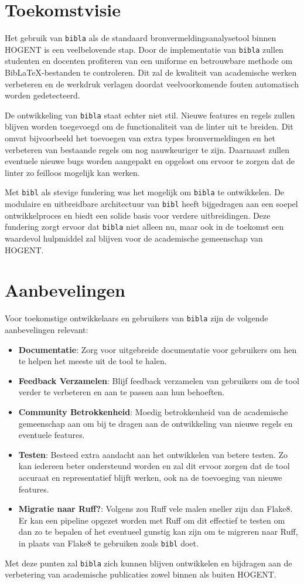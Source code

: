 \section{Toekomstvisie}
Het gebruik van \texttt{bibla} als de standaard bronvermeldingsanalysetool binnen HOGENT is een veelbelovende stap. Door de implementatie van \texttt{bibla} zullen studenten en docenten profiteren van een uniforme en betrouwbare methode om BibLaTeX-bestanden te controleren. Dit zal de kwaliteit van academische werken verbeteren en de werkdruk verlagen doordat veelvoorkomende fouten automatisch worden gedetecteerd.

De ontwikkeling van \texttt{bibla} staat echter niet stil. Nieuwe features en regels zullen blijven worden toegevoegd om de functionaliteit van de linter uit te breiden. Dit omvat bijvoorbeeld het toevoegen van extra types bronvermeldingen en het verbeteren van bestaande regels om nog nauwkeuriger te zijn. Daarnaast zullen eventuele nieuwe bugs worden aangepakt en opgelost om ervoor te zorgen dat de linter zo feilloos mogelijk kan werken.

Met \texttt{bibl} als stevige fundering was het mogelijk om \texttt{bibla} te ontwikkelen. De modulaire en uitbreidbare architectuur van \texttt{bibl} heeft bijgedragen aan een soepel ontwikkelproces en biedt een solide basis voor verdere uitbreidingen. Deze fundering zorgt ervoor dat \texttt{bibla} niet alleen nu, maar ook in de toekomst een waardevol hulpmiddel zal blijven voor de academische gemeenschap van HOGENT.

\section{Aanbevelingen}

Voor toekomstige ontwikkelaars en gebruikers van \texttt{bibla} zijn de volgende aanbevelingen relevant:
\begin{itemize}
  \item \textbf{Documentatie}: Zorg voor uitgebreide documentatie voor gebruikers om hen te helpen het meeste uit de tool te halen.
  \item \textbf{Feedback Verzamelen}: Blijf feedback verzamelen van gebruikers om de tool verder te verbeteren en aan te passen aan hun behoeften.
  \item \textbf{Community Betrokkenheid}: Moedig betrokkenheid van de academische gemeenschap aan om bij te dragen aan de ontwikkeling van nieuwe regels en eventuele features.
  \item \textbf{Testen}: Besteed extra aandacht aan het ontwikkelen van betere testen. Zo kan iedereen beter ondersteund worden en zal dit ervoor zorgen dat de tool accuraat en representatief blijft werken, ook na de toevoeging van nieuwe features.
  \item \textbf{Migratie naar Ruff?}: Volgens \textcite{Astral2024} zou Ruff vele malen sneller zijn dan Flake8. Er kan een pipeline opgezet worden met Ruff om dit effectief te testen om dan zo te bepalen of het eventueel gunstig kan zijn om te migreren naar Ruff, in plaats van Flake8 te gebruiken zoals \texttt{bibl} doet.
\end{itemize}

Met deze punten zal \texttt{bibla} zich kunnen blijven ontwikkelen en bijdragen aan de verbetering van academische publicaties zowel binnen als buiten HOGENT.
